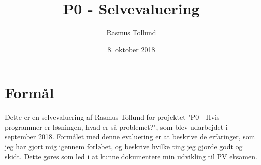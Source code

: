 \documentclass[10pt,a4paper]{article}
\author{Rasmus Tollund}
\title{P0 - Selvevaluering}
\date{8. oktober 2018}
\begin{document}
\maketitle

\section*{Formål}
Dette er en selvevaluering af Rasmus Tollund for projektet "P0 - Hvis programmer er løsningen, hvad er så problemet?", som blev udarbejdet i september 2018. Formålet med denne evaluering er at beskrive de erfaringer, som jeg har gjort mig igennem forløbet, og beskrive hvilke ting jeg gjorde godt og skidt. Dette gøres som led i at kunne dokumentere min udvikling til PV eksamen.
\end{document}
